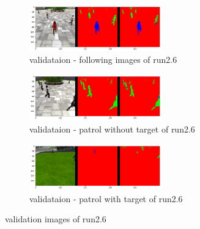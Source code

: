 \documentclass[paper=a4, fontsize=11pt]{scrartcl} %
\numberwithin{equation}{section} %
\numberwithin{figure}{section} %
\numberwithin{table}{section} %
\begin{document}
\begin{figure}[ht]
	\begin{subfigure}{0.33\textwidth}
	\includegraphics[width=0.9\linewidth, height=2cm]{./imgs/following_images26.png} 
	\caption{validataion - following images of run2.6}
	\label{fig:subfollowing_images26}
	\end{subfigure}
	\begin{subfigure}{0.33\textwidth}
	\includegraphics[width=0.9\linewidth, height=2cm]{./imgs/patrol_non_targ26.png}
	\caption{validataion - patrol without target of run2.6}
	\label{fig:subpatrol_non_targ26}
	\end{subfigure}
	\begin{subfigure}{0.33\textwidth}
	\includegraphics[width=0.9\linewidth, height=2cm]{./imgs/patrol_with_targ26.png}
	\caption{validataion - patrol with target of run2.6}
	\label{fig:subpatrol_with_targ26}
	\end{subfigure}

	\caption{validation images of run2.6}
	\label{fig:outputimages26}
\end{figure}
\end{document}
